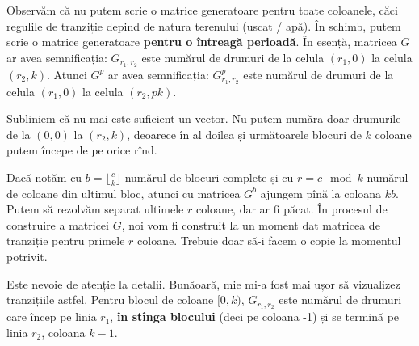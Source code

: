 \documentclass[../main.tex]{subfiles}
\begin{document}
Observăm că nu putem scrie o matrice generatoare pentru toate coloanele, căci regulile de tranziție depind de natura terenului (uscat / apă). În schimb, putem scrie o matrice generatoare \textbf{pentru o întreagă perioadă}. În esență, matricea $G$ ar avea semnificația: $G_{r_1, r_2}$ este numărul de drumuri de la celula $(r_1, 0)$ la celula $(r_2, k)$. Atunci $G^p$ ar avea semnificația: $G^p_{r_1, r_2}$ este numărul de drumuri de la celula $(r_1, 0)$ la celula $(r_2, pk)$.

Subliniem că nu mai este suficient un vector. Nu putem număra doar drumurile de la $(0,0)$ la $(r_2, k)$, deoarece în al doilea și următoarele blocuri de $k$ coloane putem începe de pe orice rînd.

Dacă notăm cu $b = \lfloor \frac{c}{k} \rfloor$ numărul de blocuri complete și cu $r = c \mod k$ numărul de coloane din ultimul bloc, atunci cu matricea $G^b$ ajungem pînă la coloana $kb$. Putem să rezolvăm separat ultimele $r$ coloane, dar ar fi păcat. În procesul de construire a matricei $G$, noi vom fi construit la un moment dat matricea de tranziție pentru primele $r$ coloane. Trebuie doar să-i facem o copie la momentul potrivit.

Este nevoie de atenție la detalii. Bunăoară, mie mi-a fost mai ușor să vizualizez tranzițiile astfel. Pentru blocul de coloane $[0, k)$, $G_{r_1, r_2}$ este numărul de drumuri care încep pe linia $r_1$, \textbf{în stînga blocului} (deci pe coloana -1) și se termină pe linia $r_2$, coloana $k-1$.
\end{document}

